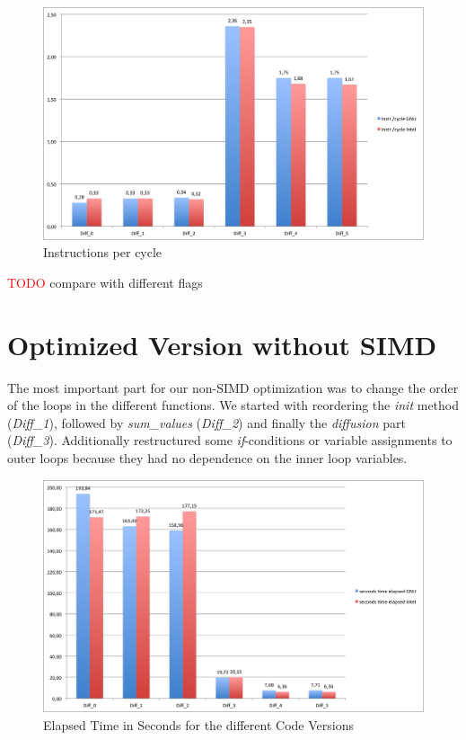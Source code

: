 \documentclass[12pt,a4paper]{article}
\begin{document}
\begin{figure}
	\centering
	\includegraphics[width=1.0\linewidth]{"Benchmark/Instrcycle"}
	\caption{Instructions per cycle}
	\label{fig:instrcycle}
\end{figure}


\textcolor{red}{TODO} compare with different flags

\section{Optimized Version without SIMD}

The most important part for our non-SIMD optimization was to change the order of the loops in the different functions. We started with reordering the \emph{init} method (\emph{Diff\_1}), followed by \emph{sum\_values} (\emph{Diff\_2}) and finally the \emph{diffusion} part (\emph{Diff\_3}). Additionally restructured some \emph{if}-conditions or variable assignments to outer loops because they had no dependence on the inner loop variables.  

 
\begin{figure}
	\centering
	\includegraphics[width=1.0\linewidth]{"Benchmark/seconds"}
	\caption{Elapsed Time in Seconds for the different Code Versions}
	\label{fig:seconds}
\end{figure}
\end{document}
